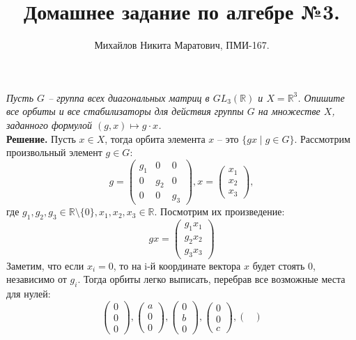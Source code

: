 \documentclass[a4paper, 12pt]{article}
\title{
     Домашнее задание по алгебре №3.
 }
\author{Михайлов Никита Маратович, ПМИ-167.
}
\date{}
\newcommand{\R}{\mathbb{R}}
\begin{document}
\maketitle
\begin{spacing}{1}


\begin{center}
\end{center}

\noindent \textit{Пусть $G$ -- группа всех диагональных матриц в $GL_3(\R)$ и $X = \R^3$. Опишите все орбиты и все стабилизаторы для действия группы $G$ на множестве $X$, заданного формулой $(g, x)\mapsto g \cdot x$.}\\[5pt]
\noindent \textbf{Решение.} Пусть $x \in X$, тогда орбита элемента $x$ -- это $\{gx\;|\;g \in G\}$. Рассмотрим произвольный элемент $g \in G$:
$$
g = \begin{pmatrix}
g_1 & 0 & 0\\
0 & g_2 & 0\\
0 & 0 & g_3
\end{pmatrix}, x = \begin{pmatrix}
x_1 \\ x_2 \\ x_3
\end{pmatrix},
$$
где $g_1, g_2, g_3 \in \R\setminus\{0\}, x_1, x_2, x_3 \in \R $. Посмотрим их произведение:
$$
gx = \begin{pmatrix}
g_1x_1\\ g_2x_2\\ g_3x_3
\end{pmatrix}
$$
Заметим, что если $x_i = 0$, то на i-й координате вектора $x$ будет стоять 0, независимо от $g_i$. Тогда орбиты легко выписать, перебрав все возможные места для нулей:
$$
\begin{pmatrix}
0\\0\\0
\end{pmatrix},
\begin{pmatrix}
a\\0\\0
\end{pmatrix},
\begin{pmatrix}
0\\b\\0
\end{pmatrix},
\begin{pmatrix}
0\\0\\c
\end{pmatrix},
\begin{pmatrix}

\end{pmatrix}$$
\end{spacing}
\end{document}
